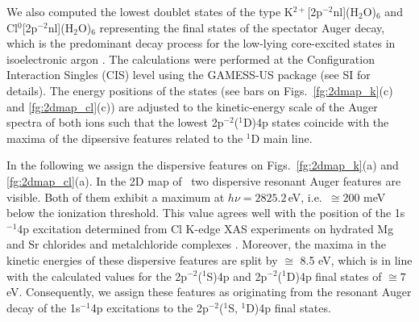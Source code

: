 {\color{blue} We also computed the lowest doublet states of the type K$^{2+}$[2p$^{-2}$nl](H$_2$O)$_6$ and Cl$^{0}$[2p$^{-2}$nl](H$_2$O)$_6$ representing the final states of the spectator Auger decay, which is the predominant decay process for the low-lying core-excited states in isoelectronic argon \citep{ceolin15:022502}. The calculations were performed at the Configuration Interaction Singles (CIS) level using the GAMESS-US package \citep{GUGA_PhysScr_21,GUGA_JCP_70,GUS} (see SI for details).} The energy positions of the states (see bars on Figs.\ \ref{fg:2dmap_k}(c) and \ref{fg:2dmap_cl}(c)) are adjusted to the kinetic-energy scale of the Auger spectra of both ions such that the lowest 2p$^{-2}$($^1$D)4p states coincide with the maxima of the dipsersive features related to the $^1$D main line. 



{\color{blue} In the following we assign the dispersive features on Figs.\ \ref{fg:2dmap_k}(a) and \ref{fg:2dmap_cl}(a). In the 2D map of \cli~two dispersive resonant Auger features are visible.} Both of them exhibit a maximum at $h\nu =  2825.2$\,eV, {\color{blue} i.e.\ $\cong 200$ meV below the ionization threshold. This value agrees well with the position of the  1s$^{-1}$4p excitation determined from Cl K-edge XAS experiments on hydrated Mg and Sr chlorides \citep{sugiura82:681} and metalchloride complexes \citep{shadle95:2259}. Moreover, the maxima in the kinetic energies of these dispersive features are split by $\cong$ 8.5 eV, which is in line with the calculated values for the 2p$^{-2}$($^1$S)4p and 2p$^{-2}$($^1$D)4p final states of $\cong 7$ eV. Consequently, we assign these features as originating from the resonant Auger decay of the 1s$^{-1}$4p excitations to the 2p$^{-2}$($^1$S, $^1$D)4p final states.} 



